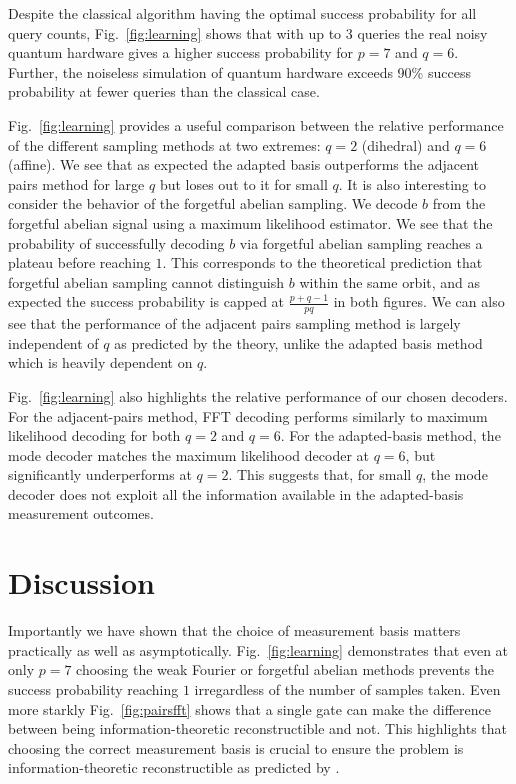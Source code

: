 Despite the classical algorithm having the optimal success probability for all query counts, Fig.~\ref{fig:learning} shows that with up to 3 queries the real noisy quantum hardware gives a higher success probability for $p=7$ and $q=6$. Further, the noiseless simulation of quantum hardware exceeds 90\% success probability at fewer queries than the classical case. 

Fig.~\ref{fig:learning} provides a useful comparison between the relative performance of the different sampling methods at two extremes: $q=2$ (dihedral) and $q=6$ (affine). We see that as expected the adapted basis outperforms the adjacent pairs method for large $q$ but loses out to it for small $q$. It is also interesting to consider the behavior of the forgetful abelian sampling. We decode $b$ from the forgetful abelian signal using a maximum likelihood estimator. We see that the probability of successfully decoding $b$ via forgetful abelian sampling reaches a plateau before reaching $1$. This corresponds to the theoretical prediction that forgetful abelian sampling cannot distinguish $b$ within the same orbit, and as expected the success probability is capped at $\frac{p+q-1}{pq}$ in both figures. We can also see that the performance of the adjacent pairs sampling method is largely independent of $q$ as predicted by the theory, unlike the adapted basis method which is heavily dependent on $q$.

Fig.~\ref{fig:learning} also highlights the relative performance of our chosen decoders. For the adjacent-pairs method, FFT decoding performs similarly to maximum likelihood decoding for both $q=2$ and $q=6$. For the adapted-basis method, the mode decoder matches the maximum likelihood decoder at $q=6$, but significantly underperforms at $q=2$. This suggests that, for small $q$, the mode decoder does not exploit all the information available in the adapted-basis measurement outcomes.

\section{Discussion}
\label{section:hsp_discussion}
Importantly we have shown that the choice of measurement basis matters practically as well as asymptotically. Fig.~\ref{fig:learning} demonstrates that even at only $p=7$ choosing the weak Fourier or forgetful abelian methods prevents the success probability reaching $1$ irregardless of the number of samples taken. Even more starkly Fig.~\ref{fig:pairsfft} shows that a single gate can make the difference between being information-theoretic reconstructible and not. This highlights that choosing the correct measurement basis is crucial to ensure the problem is information-theoretic reconstructible as predicted by \cite{moore2007power}.

